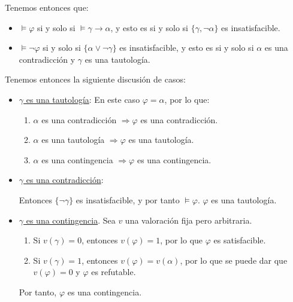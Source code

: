 \begin{ejercicio}
    Tenemos entonces que:
    \begin{itemize}
        \item $\vDash \varphi$ si y solo si $\vDash \gamma\rightarrow \alpha$, y esto es si y solo si $\{\gamma,\lnot \alpha\}$ es insatisfacible.
        \item $\vDash \lnot \varphi$ si y solo si $\{\alpha\lor \lnot \gamma\}$ es insatisfacible,
        y esto es si y solo si $\alpha$ es una contradicción y $\gamma$ es una tautología.
    \end{itemize}

    Tenemos entonces la siguiente discusión de casos:
    \begin{itemize}
        \item \ul{$\gamma$ es una tautología}: En este caso $\varphi=\alpha$, por lo que:
        \begin{enumerate}
            \item $\alpha$ es una contradicción $\Longrightarrow \varphi$ es una contradicción.
            \item $\alpha$ es una tautología $\Longrightarrow \varphi$ es una tautología.
            \item $\alpha$ es una contingencia $\Longrightarrow \varphi$ es una contingencia.
        \end{enumerate}
        \item \ul{$\gamma$ es una contradicción}:
        
        Entonces $\{\lnot \gamma\}$ es insatisfacible, y por tanto $\vDash \varphi$. $\varphi$ es una tautología.

        \item \ul{$\gamma$ es una contingencia}. Sea $v$ una valoración fija pero arbitraria.
        \begin{enumerate}
            \item Si $v(\gamma)=0$, entonces $v(\varphi)=1$, por lo que $\varphi$ es satisfacible.
            \item Si $v(\gamma)=1$, entonces $v(\varphi)=v(\alpha)$, por lo que se puede dar que $v(\varphi)=0$ y $\varphi$ es refutable.
        \end{enumerate}

        Por tanto, $\varphi$ es una contingencia.
    \end{itemize}
\end{ejercicio}

